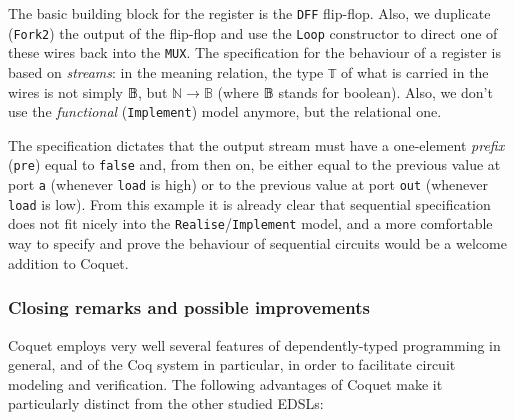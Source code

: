 
            The basic building block for the register is the \texttt{DFF} flip-flop. Also, we
            duplicate (\texttt{Fork2}) the output of the flip-flop and use the \texttt{Loop}
            constructor to direct one of these wires back into the \texttt{MUX}. The specification
            for the behaviour of a register is based on \emph{streams}: in the meaning relation, the
            type \texttt{𝕋} of what is carried in the wires is not simply 𝔹, but $ ℕ \rightarrow 𝔹 $
            (where 𝔹 stands for boolean). Also, we don't use the \emph{functional}
            (\texttt{Implement}) model anymore, but the relational one.


            The specification dictates that the output stream must have a one-element \emph{prefix}
            (\texttt{pre}) equal to \texttt{false} and, from then on, be either equal to the previous
            value at port \texttt{a} (whenever \texttt{load} is high) or to the previous value at
            port \texttt{out} (whenever \texttt{load} is low). From this example it is already clear
            that sequential specification does not fit nicely into the
            \texttt{Realise}/\texttt{Implement} model, and a more comfortable way to specify and
            prove the behaviour of sequential circuits would be a welcome addition to Coquet.


        \subsubsection{Closing remarks and possible improvements}
        \label{subsubsec:coquet-improv}
            Coquet employs very well several features of dependently-typed programming in general,
            and of the Coq system in particular, in order to facilitate circuit modeling and
            verification. The following advantages of Coquet make it particularly distinct from
            the other studied EDSLs:

